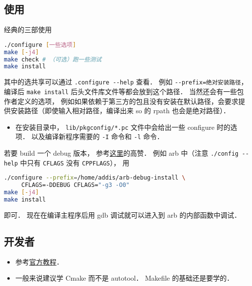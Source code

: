 
\begin{issues}
\issueDraft
\end{issues}



\subsection{使用}
经典的三部使用
\begin{lstlisting}[language=bash]
./configure [一些选项]
make [-j4]
make check # （可选）跑一些测试
make install
\end{lstlisting}
其中的选共享可以通过 \verb|.configure --help| 查看． 例如 \verb|--prefix=绝对安装路径|， 编译后 \verb|make install| 后头文件库文件等都会放到这个路径． 当然还会有一些包作者定义的选项， 例如如果依赖于第三方的包且没有安装在默认路径，会要求提供安装路径（即使输入相对路径，编译出来 so 的 rpath 也会是绝对路径）．

\begin{itemize}
\item 在安装目录中， \verb|lib/pkgconfig/*.pc| 文件中会给出一些 configure 时的选项． 以及编译新程序需要的 \verb|-I| 命令和 \verb|-l| 命令．
\end{itemize}

若要 build 一个 debug 版本， 参考\href{https://stackoverflow.com/questions/4553735/gnu-autotools-debug-release-targets}{这里}的高赞． 例如 arb 中（注意 \verb|./config --help| 中只有 \verb|CFLAGS| 没有 \verb|CPPFLAGS|）， 用
\begin{lstlisting}[language=bash]
./configure --prefix=/home/addis/arb-debug-install \
     CFLAGS=-DDEBUG CFLAGS="-g3 -O0"
make [-j4]
make install
\end{lstlisting}
即可． 现在在编译主程序后用 gdb 调试就可以进入到 arb 的内部函数中调试．

\subsection{开发者}
\begin{itemize}
\item 参考\href{https://www.gnu.org/software/automake/manual/html_node/Autotools-Introduction.html}{官方教程}．
\item 一般来说建议学 Cmake\upref{CMakeN} 而不是 autotool． Makefile 的基础还是要学的．
\end{itemize}
